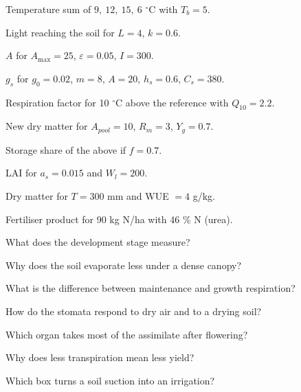 \begin{exlist}
\item Temperature sum of $9,\ 12,\ 15,\ 6$ $^\circ$C with $T_b=5$.
\item Light reaching the soil for $L=4$, $k=0.6$.
\item $A$ for $A_{\max}=25$, $\varepsilon=0.05$, $I=300$.
\item $g_s$ for $g_0=0.02$, $m=8$, $A=20$, $h_s=0.6$, $C_s=380$.
\item Respiration factor for 10 $^\circ$C above the reference with $Q_{10}=2.2$.
\item New dry matter for $A_{pool}=10$, $R_m=3$, $Y_g=0.7$.
\item Storage share of the above if $f=0.7$.
\item LAI for $a_s=0.015$ and $W_l=200$.
\item Dry matter for $T=300$ mm and WUE $=4$ g/kg.
\item Fertiliser product for 90 kg N/ha with 46 \% N (urea).
\end{exlist}

\begin{exlist}
\item What does the development stage measure?
\item Why does the soil evaporate less under a dense canopy?
\item What is the difference between maintenance and growth respiration?
\item How do the stomata respond to dry air and to a drying soil?
\item Which organ takes most of the assimilate after flowering?
\item Why does less transpiration mean less yield?
\item Which box turns a soil suction into an irrigation?
\end{exlist}
